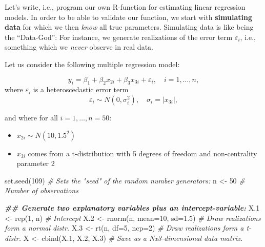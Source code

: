 \documentclass[
  14pt,
]{memoir}
\newenvironment{Shaded}{\begin{snugshade}}{\end{snugshade}}
\newcommand{\AttributeTok}[1]{\textcolor[rgb]{0.77,0.63,0.00}{#1}}
\newcommand{\CommentTok}[1]{\textcolor[rgb]{0.56,0.35,0.01}{\textit{#1}}}
\newcommand{\DecValTok}[1]{\textcolor[rgb]{0.00,0.00,0.81}{#1}}
\newcommand{\DocumentationTok}[1]{\textcolor[rgb]{0.56,0.35,0.01}{\textbf{\textit{#1}}}}
\newcommand{\FloatTok}[1]{\textcolor[rgb]{0.00,0.00,0.81}{#1}}
\newcommand{\FunctionTok}[1]{\textcolor[rgb]{0.00,0.00,0.00}{#1}}
\newcommand{\NormalTok}[1]{#1}
\newcommand{\OtherTok}[1]{\textcolor[rgb]{0.56,0.35,0.01}{#1}}
\providecommand{\tightlist}{%
  \setlength{\itemsep}{0pt}\setlength{\parskip}{0pt}}
\begin{document}
Let's write, i.e., program our own R-function for estimating linear regression models. In order to be able to validate our function, we start with \textbf{simulating data} for which we then \emph{know} all true parameters. Simulating data is like being the ``Data-God'': For instance, we generate realizations of the error term \(\varepsilon_i\), i.e., something which we \emph{never} observe in real data.

\hfill\break

Let us consider the following multiple regression model:

\[y_i=\beta_1 +\beta_2 x_{2i}+\beta_3 x_{3i}+\varepsilon_{i},\quad i=1,\dots,n,\]
where \(\varepsilon_{i}\) is a heteroscedastic error term
\[\varepsilon_{i}\sim N(0,\sigma_i^2),\quad \sigma_i=|x_{3i}|,\]

and where for all \(i=1,\dots,n=50\):

\begin{itemize}
\tightlist
\item
  \(x_{2i}\sim N(10,1.5^2)\)
\item
  \(x_{3i}\) comes from a t-distribution with 5 degrees of freedom and non-centrality parameter 2
\end{itemize}

\begin{Shaded}
\begin{Highlighting}[]
\FunctionTok{set.seed}\NormalTok{(}\DecValTok{109}\NormalTok{) }\CommentTok{\# Sets the "seed" of the random number generators:}
\NormalTok{n   }\OtherTok{\textless{}{-}} \DecValTok{50}     \CommentTok{\# Number of observations}

\DocumentationTok{\#\# Generate two explanatory variables plus an intercept{-}variable:}
\NormalTok{X}\FloatTok{.1} \OtherTok{\textless{}{-}} \FunctionTok{rep}\NormalTok{(}\DecValTok{1}\NormalTok{, n)                 }\CommentTok{\# Intercept}
\NormalTok{X}\FloatTok{.2} \OtherTok{\textless{}{-}} \FunctionTok{rnorm}\NormalTok{(n, }\AttributeTok{mean=}\DecValTok{10}\NormalTok{, }\AttributeTok{sd=}\FloatTok{1.5}\NormalTok{) }\CommentTok{\# Draw realizations form a normal distr.}
\NormalTok{X}\FloatTok{.3} \OtherTok{\textless{}{-}} \FunctionTok{rt}\NormalTok{(n, }\AttributeTok{df=}\DecValTok{5}\NormalTok{, }\AttributeTok{ncp=}\DecValTok{2}\NormalTok{)        }\CommentTok{\# Draw realizations form a t{-}distr.}
\NormalTok{X   }\OtherTok{\textless{}{-}} \FunctionTok{cbind}\NormalTok{(X}\FloatTok{.1}\NormalTok{, X}\FloatTok{.2}\NormalTok{, X}\FloatTok{.3}\NormalTok{)      }\CommentTok{\# Save as a Nx3{-}dimensional data matrix.}
\end{Highlighting}
\end{Shaded}
\end{document}
